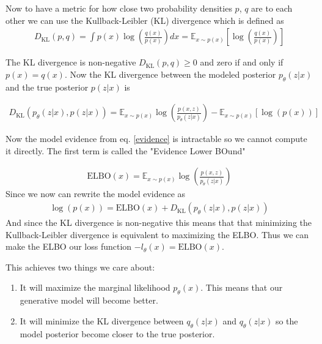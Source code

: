 Now to have a metric for how close two probability densities $p$, $q$ are to each other we can use the Kullback-Leibler (KL) divergence which is defined as
\begin{align}
D_{\text{KL}}(p,q) = \int p(x)\log \left(\frac{q(x)}{p(x)}\right) dx =  \mathbb{E}_{x\sim p(x)}\left[ \log\left(\frac{q(x)}{p(x)}\right)\right]
\end{align}

The KL divergence is non-negative $D_{\text{KL}}(p,q) \geq 0$ and zero if and only if $p(x) = q(x)$. Now the KL divergence  between the modeled posterior $ p_\theta(z|x)$ and the true posterior  $p(z|x)$ is

\begin{align}
    D_{\text{KL}}(p_\theta(z|x),p(z|x)) = \mathbb{E}_{x\sim p(x)} \log\left(\frac{p(x,z)}{p_\theta(z|x)}\right) -  \mathbb{E}_{x\sim p(x)} \left[\log(p(x))\right]
\end{align}

Now the model evidence from eq. \ref{evidence} is intractable so we cannot compute it directly. The first term is called the "Evidence Lower BOund"

\begin{align}
    \text{ELBO}(x) = \mathbb{E}_{x\sim p(x)} \log\left(\frac{p(x,z)}{p_\theta(z|x)}\right)
\end{align}
Since we now can rewrite the model evidence as
\begin{align}
    \log(p(x)) = \text{ELBO}(x) +  D_{\text{KL}}(p_\theta(z|x),p(z|x))
\end{align}
And since the KL divergence is non-negative this means that that minimizing the Kullback-Leibler divergence is equivalent to maximizing the ELBO. Thus we can make the ELBO our loss function $-l_\theta(x)=\text{ELBO}(x)$.

This achieves two things we care about\cite{vaeintro}:

\begin{enumerate}
    \item It will maximize the marginal likelihood $p_\theta(x)$.
This means that our generative model will become better.
    \item It will minimize the KL divergence between $q_\theta(z|x)$ and $q_\theta(z|x)$ so the model posterior become closer to the true posterior.
\end{enumerate}




